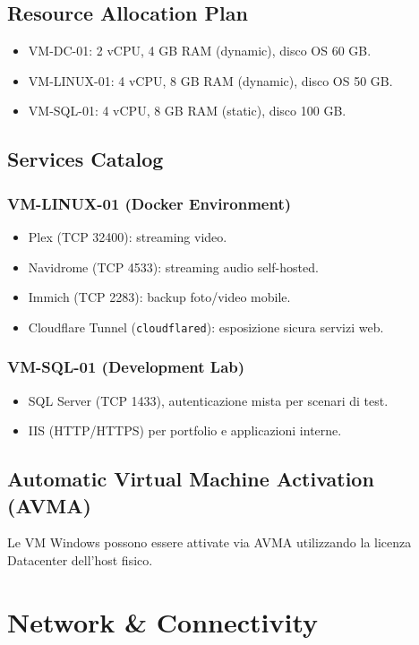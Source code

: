 \documentclass[11pt,a4paper]{article}
\begin{document}
\subsection{Resource Allocation Plan}
\begin{itemize}
  \item VM-DC-01: 2 vCPU, 4 GB RAM (dynamic), disco OS 60 GB.
  \item VM-LINUX-01: 4 vCPU, 8 GB RAM (dynamic), disco OS 50 GB.
  \item VM-SQL-01: 4 vCPU, 8 GB RAM (static), disco 100 GB.
\end{itemize}

\subsection{Services Catalog}
\subsubsection*{VM-LINUX-01 (Docker Environment)}
\begin{itemize}
  \item Plex (TCP 32400): streaming video.
  \item Navidrome (TCP 4533): streaming audio self-hosted.
  \item Immich (TCP 2283): backup foto/video mobile.
  \item Cloudflare Tunnel (\texttt{cloudflared}): esposizione sicura servizi web.
\end{itemize}

\subsubsection*{VM-SQL-01 (Development Lab)}
\begin{itemize}
  \item SQL Server (TCP 1433), autenticazione mista per scenari di test.
  \item IIS (HTTP/HTTPS) per portfolio e applicazioni interne.
\end{itemize}

\subsection{Automatic Virtual Machine Activation (AVMA)}
Le VM Windows possono essere attivate via AVMA utilizzando la licenza Datacenter dell'host fisico.

\section{Network \& Connectivity}
\end{document}
